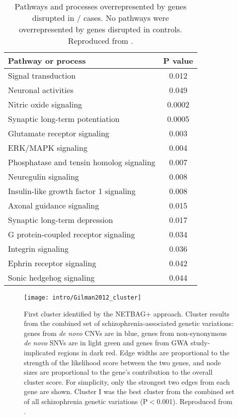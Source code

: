 \begin{table}
\centering
\begin{tabular}{l c}
\textbf{Pathway or process} & \textbf{P value} \\
\hline
Signal transduction & 0.012 \\
Neuronal activities & 0.049 \\
Nitric oxide signaling & 0.0002 \\
Synaptic long-term potentiation & 0.0005 \\
Glutamate receptor signaling & 0.003 \\
ERK/MAPK signaling & 0.004 \\
Phosphatase and tensin homolog signaling & 0.007 \\
Neuregulin signaling & 0.008 \\
Insulin-like growth factor 1 signaling & 0.008 \\
Axonal guidance signaling & 0.015 \\
Synaptic long-term depression & 0.017 \\
G protein-coupled receptor signaling & 0.034 \\
Integrin signaling & 0.036 \\
Ephrin receptor signaling & 0.042 \\
Sonic hedgehog signaling & 0.044 \\
\end{tabular}
\caption[Pathways implicated in \scz/]{Pathways and processes overrepresented by genes disrupted in \scz/ cases. No pathways were overrepresented by genes disrupted in controls.
	Reproduced from \citet{Walsh2008}.}
\label{table:intro:scz:pathways}
\end{table}

\begin{figure}
	\centering
	\texttt{[image: intro/Gilman2012\_cluster]}
	\caption[First cluster identified by the NETBAG+ approach]{First cluster identified by the NETBAG+ approach.
	Cluster results from the combined set of schizophrenia-associated genetic variations: genes from \textit{de novo} \acp{CNV} are in blue, genes from non-synonymous \textit{de novo} \acp{SNV} are in light green and genes from \ac{GWA} study-implicated regions in dark red. Edge widths are proportional to the strength of the likelihood score between the two genes, and node sizes are proportional to the gene's contribution to the overall cluster score. For simplicity, only the strongest two edges from each gene are shown. Cluster I was the best cluster from the combined set of all schizophrenia genetic variations (P$<$0.001).
	Reproduced from \citet{Gilman2012}.}
	\label{fig:intro:scz:cluster}
\end{figure}

